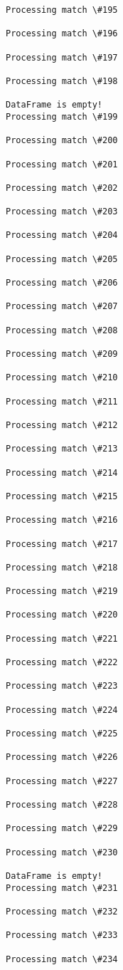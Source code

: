 \documentclass[11pt]{article}
\begin{document}
\begin{Verbatim}[commandchars=\\\{\}]
Processing match \#195

Processing match \#196

Processing match \#197

Processing match \#198

DataFrame is empty!
Processing match \#199

Processing match \#200

Processing match \#201

Processing match \#202

Processing match \#203

Processing match \#204

Processing match \#205

Processing match \#206

Processing match \#207

Processing match \#208

Processing match \#209

Processing match \#210

Processing match \#211

Processing match \#212

Processing match \#213

Processing match \#214

Processing match \#215

Processing match \#216

Processing match \#217

Processing match \#218

Processing match \#219

Processing match \#220

Processing match \#221

Processing match \#222

Processing match \#223

Processing match \#224

Processing match \#225

Processing match \#226

Processing match \#227

Processing match \#228

Processing match \#229

Processing match \#230

DataFrame is empty!
Processing match \#231

Processing match \#232

Processing match \#233

Processing match \#234


\end{Verbatim}
\end{document}
